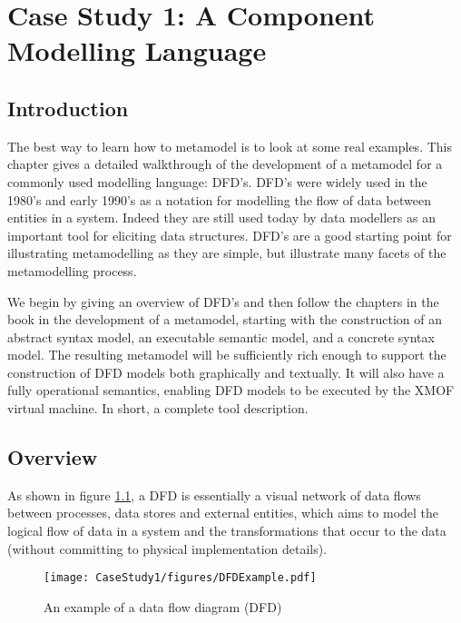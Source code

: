 \chapter{Case Study 1: A Component Modelling Language}

\section{Introduction}

The best way to learn how to metamodel is to look at some real
examples. This chapter gives a detailed walkthrough of the
development of a metamodel for a commonly used modelling language:
DFD's. DFD's were widely used in the 1980's and early 1990's as a
notation for modelling the flow of data between entities in a
system. Indeed they are still used today by data modellers as an
important tool for eliciting data structures. DFD's are a good
starting point for illustrating metamodelling as they are simple,
but illustrate many facets of the metamodelling process.

We begin by giving an overview of DFD's and then follow the
chapters in the book in the development of a metamodel, starting
with the construction of an abstract syntax model, an executable
semantic model, and a concrete syntax model. The resulting
metamodel will be sufficiently rich enough to support the
construction of DFD models both graphically and textually. It will
also have a fully operational semantics, enabling DFD models to be
executed by the XMOF virtual machine. In short, a complete tool
description.

\section{Overview}

As shown in figure \ref{dfdexample}, a DFD is essentially a visual
network of data flows between processes, data stores and external
entities, which aims to model the logical flow of data in a system
and the transformations that occur to the data (without committing
to physical implementation details).

\begin{figure}[htb]
\begin{center}
\texttt{[image: CaseStudy1/figures/DFDExample.pdf]}
\caption{An example of a data flow diagram (DFD)}
\label{dfdexample}
\end{center}
\end{figure}

